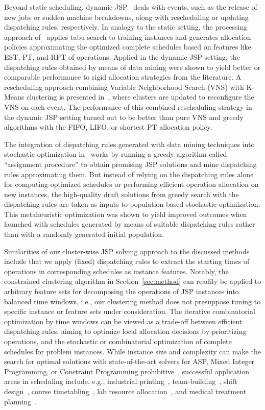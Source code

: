 \documentclass[runningheads]{llncs}
\begin{document}
Beyond static scheduling, dynamic JSP~\cite{french82a} deals with events, such as 
the release of new jobs or sudden machine breakdowns, along with rescheduling or
updating dispatching rules, respectively.
In analogy to the static setting,
the processing approach of~\cite{shahzad2010discovering} applies tabu search to
training instances and generates allocation policies approximating the optimized
complete schedules based on features like EST, PT, and RPT of operations.
Applied in the dynamic JSP setting, the dispatching rules obtained by means of data mining
were shown to yield better or comparable performance to rigid allocation strategies from the
literature.
A rescheduling approach combining Variable Neighborhood Search (VNS)
with K-Means clustering is presented in~\cite{adibi2014clustering},
where clusters are updated to reconfigure the VNS on each event.
The performance of this combined rescheduling strategy in the dynamic JSP setting turned out
to be better than pure VNS and greedy algorithms with the FIFO, LIFO, or
shortest PT allocation policy.

The integration of dispatching rules generated with data mining techniques
into stochastic optimization in~\cite{nasiri2019data} works by
running a greedy algorithm called ``assignment procedure'' to obtain promising
JSP solutions and mine dispatching rules approximating them.
But instead of relying on the dispatching rules alone for computing optimized
schedules or performing efficient operation allocation on new instances,
the high-quality draft solutions from greedy search with the dispatching rules
are taken as inputs to population-based stochastic optimization.
This metaheuristic optimization was shown to yield improved outcomes when launched
with schedules generated by means of suitable dispatching rules rather than with
a randomly generated initial population.

Similarities of our cluster-wise JSP solving approach to the discussed methods include
that we apply (fixed) dispatching rules to extract the starting times of operations
in corresponding schedules as instance features.
Notably, the constrained clustering algorithm in Section~\ref{sec:method} can readily
be applied to arbitrary feature sets for decomposing the operations of JSP instances
into balanced time windows, i.e., our clustering method does not presuppose tuning to
specific instance or feature sets under consideration.
The iterative combinatorial optimization by time windows can be viewed as a trade-off
between efficient dispatching rules, aiming to optimize local allocation decisions by
prioritizing operations, and the stochastic or combinatorial optimization of
complete schedules for problem instances.
While instance size and complexity can make the search for optimal solutions
with state-of-the-art solvers for ASP, Mixed Integer Programming, or Constraint Programming
prohibitive~\cite{coltep19a,zhang2010hybrid},
successful %
application areas in scheduling include, e.g.,
industrial printing~\cite{balduccini11a},
team-building~\cite{rigralmaliiile12a},
shift design~\cite{abgemuscwo15c},
course timetabling~\cite{bainkaokscsotawa18a},
lab resource allocation~\cite{frscel21a},
and
medical treatment planning~\cite{dogagrmamopo21a}.
\end{document}
